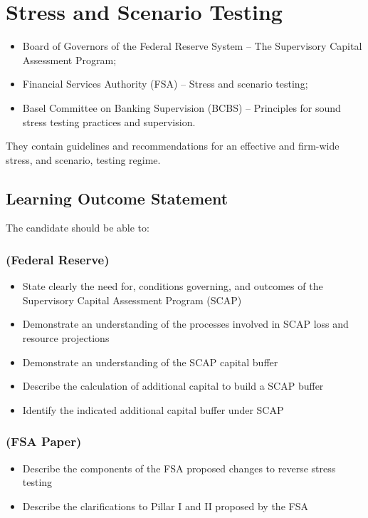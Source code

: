 \section*{Stress and Scenario Testing}
\begin{itemize}
\item Board of Governors of the Federal Reserve System – The Supervisory Capital Assessment Program;
\item Financial Services Authority (FSA) – Stress and scenario testing; 
\item Basel Committee on Banking Supervision (BCBS) – Principles for sound stress testing practices and supervision. 
\end{itemize}
They contain guidelines and recommendations for an effective and firm-wide stress, and scenario, testing regime.

\subsection*{Learning Outcome Statement}
The candidate should be able to:
\subsubsection*{(Federal Reserve)}
\begin{itemize}
\item  State clearly the need for, conditions governing, and outcomes of the Supervisory Capital Assessment Program (SCAP)
\item   Demonstrate an understanding of the processes involved in SCAP loss and resource projections
\item   Demonstrate an understanding of the SCAP capital buffer
\item   Describe the calculation of additional capital to build a SCAP buffer
\item   Identify the indicated additional capital buffer under SCAP
\end{itemize}
\subsubsection*{(FSA Paper)}
\begin{itemize}
\item  Describe the components of the FSA proposed changes to reverse stress testing
\item  Describe the clarifications to Pillar I and II proposed by the FSA
\end{itemize}
